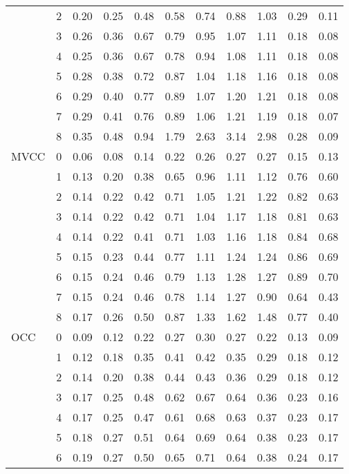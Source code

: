 \begin{tabular}{llrrrrrrrrr}
       & 2 & 0.20 & 0.25 & 0.48 & 0.58 & 0.74 & 0.88 & 1.03 & 0.29 & 0.11 \\
       & 3 & 0.26 & 0.36 & 0.67 & 0.79 & 0.95 & 1.07 & 1.11 & 0.18 & 0.08 \\
       & 4 & 0.25 & 0.36 & 0.67 & 0.78 & 0.94 & 1.08 & 1.11 & 0.18 & 0.08 \\
       & 5 & 0.28 & 0.38 & 0.72 & 0.87 & 1.04 & 1.18 & 1.16 & 0.18 & 0.08 \\
       & 6 & 0.29 & 0.40 & 0.77 & 0.89 & 1.07 & 1.20 & 1.21 & 0.18 & 0.08 \\
       & 7 & 0.29 & 0.41 & 0.76 & 0.89 & 1.06 & 1.21 & 1.19 & 0.18 & 0.07 \\
       & 8 & 0.35 & 0.48 & 0.94 & 1.79 & 2.63 & 3.14 & 2.98 & 0.28 & 0.09 \\
MVCC & 0 & 0.06 & 0.08 & 0.14 & 0.22 & 0.26 & 0.27 & 0.27 & 0.15 & 0.13 \\
       & 1 & 0.13 & 0.20 & 0.38 & 0.65 & 0.96 & 1.11 & 1.12 & 0.76 & 0.60 \\
       & 2 & 0.14 & 0.22 & 0.42 & 0.71 & 1.05 & 1.21 & 1.22 & 0.82 & 0.63 \\
       & 3 & 0.14 & 0.22 & 0.42 & 0.71 & 1.04 & 1.17 & 1.18 & 0.81 & 0.63 \\
       & 4 & 0.14 & 0.22 & 0.41 & 0.71 & 1.03 & 1.16 & 1.18 & 0.84 & 0.68 \\
       & 5 & 0.15 & 0.23 & 0.44 & 0.77 & 1.11 & 1.24 & 1.24 & 0.86 & 0.69 \\
       & 6 & 0.15 & 0.24 & 0.46 & 0.79 & 1.13 & 1.28 & 1.27 & 0.89 & 0.70 \\
       & 7 & 0.15 & 0.24 & 0.46 & 0.78 & 1.14 & 1.27 & 0.90 & 0.64 & 0.43 \\
       & 8 & 0.17 & 0.26 & 0.50 & 0.87 & 1.33 & 1.62 & 1.48 & 0.77 & 0.40 \\
OCC & 0 & 0.09 & 0.12 & 0.22 & 0.27 & 0.30 & 0.27 & 0.22 & 0.13 & 0.09 \\
       & 1 & 0.12 & 0.18 & 0.35 & 0.41 & 0.42 & 0.35 & 0.29 & 0.18 & 0.12 \\
       & 2 & 0.14 & 0.20 & 0.38 & 0.44 & 0.43 & 0.36 & 0.29 & 0.18 & 0.12 \\
       & 3 & 0.17 & 0.25 & 0.48 & 0.62 & 0.67 & 0.64 & 0.36 & 0.23 & 0.16 \\
       & 4 & 0.17 & 0.25 & 0.47 & 0.61 & 0.68 & 0.63 & 0.37 & 0.23 & 0.17 \\
       & 5 & 0.18 & 0.27 & 0.51 & 0.64 & 0.69 & 0.64 & 0.38 & 0.23 & 0.17 \\
       & 6 & 0.19 & 0.27 & 0.50 & 0.65 & 0.71 & 0.64 & 0.38 & 0.24 & 0.17 \\

\end{tabular}
